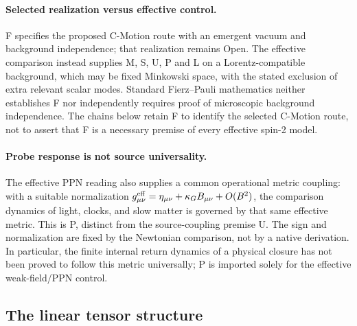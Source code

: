 \documentclass[11pt]{article}
\theoremstyle{plain}
\theoremstyle{remark}
\begin{document}
\paragraph{Selected realization versus effective control.}
F specifies the proposed C-Motion route with an emergent vacuum and
background independence; that realization remains Open.  The effective comparison instead
supplies M, S, U, P and L on a Lorentz-compatible background, which may
be fixed Minkowski space, with the stated exclusion of extra relevant
scalar modes.  Standard Fierz--Pauli mathematics neither establishes F
nor independently requires proof of microscopic background independence.
The chains below retain F to identify the selected C-Motion route, not
to assert that F is a necessary premise of every effective spin-2 model.

\paragraph{Probe response is not source universality.}
The effective PPN reading also supplies a common operational metric coupling:
with a suitable normalization $g^{\rm eff}_{\mu\nu}=\eta_{\mu\nu}
+\kappa_G B_{\mu\nu}+O(B^2)$, the comparison dynamics of light, clocks,
and slow matter is governed by that same effective metric.  This is P, distinct
from the source-coupling premise U.  The sign and normalization are fixed by
the Newtonian comparison, not by a native derivation.  In particular,
the finite internal return dynamics of a physical closure has not been proved
to follow this metric universally; P is imported solely for the effective
weak-field/PPN control.

\subsection{The linear tensor structure}
\end{document}
